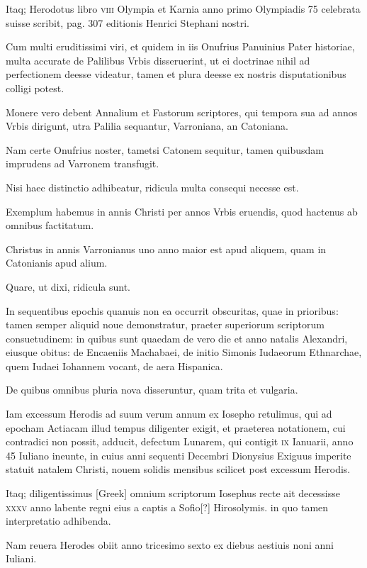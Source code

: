 \begin{parnumbers}
Itaq; Herodotus libro \textsc{viii} Olympia et Karnia anno primo
Olympiadis 75 celebrata suisse scribit, pag. 307 editionis Henrici
Stephani nostri.

Cum multi eruditissimi viri, et quidem in iis
Onufrius Panuinius Pater historiae, multa accurate de Palilibus Vrbis
disseruerint, ut ei doctrinae nihil ad perfectionem deesse videatur,
tamen et plura deesse ex nostris disputationibus colligi potest.

Monere vero debent Annalium et Fastorum scriptores, qui tempora
sua ad annos Vrbis dirigunt, utra Palilia sequantur, Varroniana,
an Catoniana.

Nam certe Onufrius noster, tametsi Catonem sequitur,
tamen quibusdam imprudens ad Varronem transfugit.

Nisi
haec distinctio adhibeatur, ridicula multa consequi necesse est.

Exemplum habemus in annis Christi per annos Vrbis eruendis,
quod hactenus ab omnibus factitatum.

Christus in annis Varronianus
uno anno maior est apud aliquem, quam in Catonianis apud alium.

Quare, ut dixi, ridicula sunt.

In sequentibus epochis quanuis
non ea occurrit obscuritas, quae in prioribus: tamen semper aliquid
noue demonstratur, praeter superiorum scriptorum consuetudinem:
in quibus sunt quaedam de vero die et anno natalis Alexandri, eiusque
obitus: de Encaeniis Machabaei, de initio Simonis Iudaeorum
Ethnarchae, quem Iudaei Iohannem vocant, de aera Hispanica.

De quibus omnibus pluria nova disseruntur, quam trita et vulgaria.

Iam
excessum Herodis ad suum verum annum ex Iosepho retulimus,
qui ad epocham Actiacam illud tempus diligenter exigit, et praeterea
notationem, cui contradici non possit, adducit, defectum Lunarem,
qui contigit \textsc{ix} Ianuarii, anno 45 Iuliano ineunte, in cuius
anni sequenti Decembri Dionysius Exiguus imperite statuit natalem
Christi, nouem solidis mensibus scilicet post excessum Herodis.

Itaq; diligentissimus \textgreek{[Greek]} omnium scriptorum Iosephus
recte ait decessisse \textsc{xxxv} anno labente regni eius a captis a Sofio[?]
Hirosolymis. in quo tamen interpretatio adhibenda.

Nam reuera Herodes
obiit anno tricesimo sexto ex diebus aestiuis noni anni Iuliani.


\end{parnumbers}

